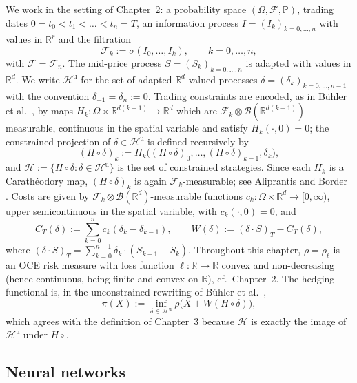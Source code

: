 \documentclass[11pt,a4paper]{report}
\numberwithin{equation}{chapter}
\theoremstyle{plain}
\theoremstyle{definition}
\newcommand{\PP}{\mathbb{P}}
\newcommand{\R}{\mathbb{R}}
\newcommand{\F}{\mathcal{F}}
\newcommand{\HH}{\mathcal{H}}
\newcommand{\Hu}{\mathcal{H}^{\mathrm{u}}}
\begin{document}
We work in the setting of Chapter~2: a probability space $(\Omega,\F,\PP)$, trading dates $0=t_0<t_1<\dots<t_n=T$, an information process $I=(I_k)_{k=0,\dots,n}$ with values in $\R^r$ and the filtration
\[
    \F_k:=\sigma(I_0,\dots,I_k),\qquad k=0,\dots,n,
\]
with $\F=\F_n$. The mid-price process $S=(S_k)_{k=0,\dots,n}$ is adapted with values in $\R^d$. We write $\Hu$ for the set of adapted $\R^d$-valued processes $\delta=(\delta_k)_{k=0,\dots,n-1}$ with the convention $\delta_{-1}=\delta_n:=0$. Trading constraints are encoded, as in B\"uhler et al.\ \cite{buehler}, by maps $H_k\colon\Omega\times\R^{d(k+1)}\to\R^d$ which are $\F_k\otimes\mathcal B(\R^{d(k+1)})$-measurable, continuous in the spatial variable and satisfy $H_k(\cdot,0)=0$; the constrained projection of $\delta\in\Hu$ is defined recursively by
\[
    (H\circ\delta)_k:=H_k\bigl((H\circ\delta)_0,\dots,(H\circ\delta)_{k-1},\delta_k\bigr),
\]
and $\HH:=\{H\circ\delta:\delta\in\Hu\}$ is the set of constrained strategies. Since each $H_k$ is a Carath\'eodory map, $(H\circ\delta)_k$ is again $\F_k$-measurable; see Aliprantis and Border \cite[Section~4.10]{aliprantisborder}. Costs are given by $\F_k\otimes\mathcal B(\R^d)$-measurable functions $c_k\colon\Omega\times\R^d\to[0,\infty)$, upper semicontinuous in the spatial variable, with $c_k(\cdot,0)=0$, and
\[
    C_T(\delta):=\sum_{k=0}^n c_k(\delta_k-\delta_{k-1}),\qquad
    W(\delta):=(\delta\cdot S)_T-C_T(\delta),
\]
where $(\delta\cdot S)_T=\sum_{k=0}^{n-1}\delta_k\cdot(S_{k+1}-S_k)$. Throughout this chapter, $\rho=\rho_\ell$ is an OCE risk measure with loss function $\ell\colon\R\to\R$ convex and non-decreasing (hence continuous, being finite and convex on $\R$), cf.\ Chapter~2. The hedging functional is, in the unconstrained rewriting of B\"uhler et al.\ \cite[Lemma~4.2]{buehler},
\begin{equation}\label{eq:pi}
    \pi(X):=\inf_{\delta\in\Hu}\rho\bigl(X+W(H\circ\delta)\bigr),
\end{equation}
which agrees with the definition of Chapter~3 because $\HH$ is exactly the image of $\Hu$ under $H\circ{}$.

\subsection*{Neural networks}
\end{document}
